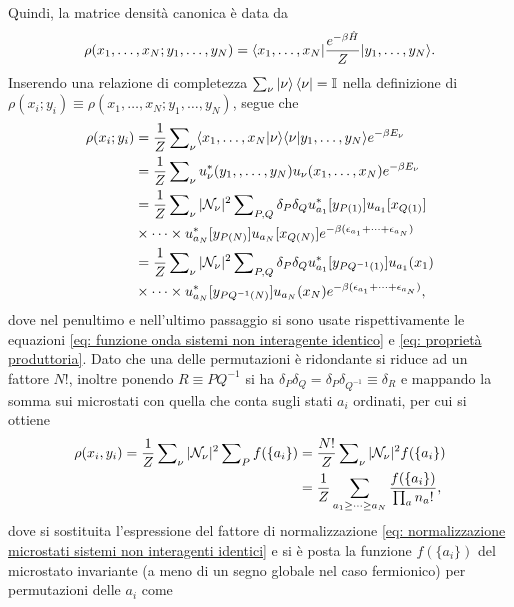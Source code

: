 Quindi, la matrice densità canonica è data da
\begin{equation}
    \rho(x_1,\dots,x_N;y_1,\dots,y_N) = \langle x_1,\dots,x_N | \frac{e^{-\beta\hat{H}}}{Z} | y_1,\dots,y_N \rangle.
\end{equation}
Inserendo una relazione di completezza $\sum\nolimits_\nu\ket{\nu}\bra{\nu} = \mathbb{I}$ nella definizione di $\rho(x_i;y_i) \equiv \rho(x_1,\dots,x_N;y_1,\dots,y_N)$, segue che 
\begin{equation}
    \begin{split}
        \rho(x_i;y_i) &= \frac{1}{Z}\sum\nolimits_\nu\langle x_1,\dots,x_N | \nu \rangle\langle \nu | y_1,\dots,y_N \rangle e^{-\beta E_\nu} \\
        &= \frac{1}{Z}\sum\nolimits_\nu u_\nu^*(y_1,,\dots,y_N)u_{\nu}(x_1,\dots,x_N)e^{-\beta E_\nu} \\
        &= \frac{1}{Z}\sum\nolimits_\nu|\mathcal{N}_\nu|^2\sum\nolimits_{P,Q}\delta_P\delta_Qu_{a_1}^*[y_{P(1)}]u_{a_1}[x_{Q(1)}]\\
        &\times\cdots\times u_{a_N}^*[y_{P(N)}]u_{a_N}[x_{Q(N)}]e^{-\beta(\epsilon_{a_1}+\cdots+\epsilon_{a_N})} \\
        &= \frac{1}{Z}\sum\nolimits_\nu|\mathcal{N}_\nu|^2\sum\nolimits_{P,Q}\delta_P\delta_Qu_{a_1}^*[y_{PQ^{-1}(1)}]u_{a_1}(x_1)\\
        &\times\cdots\times u_{a_N}^*[y_{PQ^{-1}(N)}]u_{a_N}(x_N)e^{-\beta(\epsilon_{a_1}+\cdots+\epsilon_{a_N})},
    \end{split}
\end{equation}
dove nel penultimo e nell'ultimo passaggio si sono usate rispettivamente le equazioni \eqref{eq: funzione onda sistemi non interagente identico} e \eqref{eq: proprietà produttoria}. Dato che una delle permutazioni è ridondante si riduce ad un fattore $N!$, inoltre ponendo $R \equiv PQ^{-1}$ si ha $\delta_P\delta_Q = \delta_P\delta_{Q^{-1}} \equiv \delta_R$ e mappando la somma sui microstati con quella che conta sugli stati $a_i$ ordinati, per cui si ottiene
\begin{equation}
    \begin{split}
        \rho(x_i,y_i) = \frac{1}{Z}\sum\nolimits_\nu|\mathcal{N}_\nu|^2\sum\nolimits_Pf(\{a_i\}) &= \frac{N!}{Z}\sum\nolimits_\nu|\mathcal{N}_\nu|^2f(\{a_i\}) \\
        &= \frac{1}{Z}\sum_{a_1\ge\cdots\ge a_N}\frac{f(\{a_i\})}{\prod\nolimits_a n_a!},
    \end{split}
\end{equation}
dove si sostituita l'espressione del fattore di normalizzazione \eqref{eq: normalizzazione microstati sistemi non interagenti identici} e si è posta la funzione $f(\{a_i\})$ del microstato invariante (a meno di un segno globale nel caso fermionico) per permutazioni delle $a_i$ come
